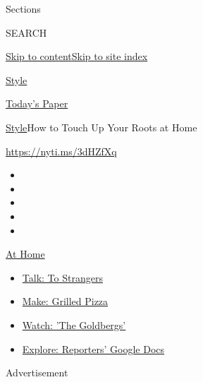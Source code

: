 Sections

SEARCH

\protect\hyperlink{site-content}{Skip to
content}\protect\hyperlink{site-index}{Skip to site index}

\href{https://www.nytimes3xbfgragh.onion/section/style}{Style}

\href{https://myaccount.nytimes3xbfgragh.onion/auth/login?response_type=cookie\&client_id=vi}{}

\href{https://www.nytimes3xbfgragh.onion/section/todayspaper}{Today's
Paper}

\href{/section/style}{Style}\textbar{}How to Touch Up Your Roots at Home

\url{https://nyti.ms/3dHZfXq}

\begin{itemize}
\item
\item
\item
\item
\item
\end{itemize}

\href{https://www.nytimes3xbfgragh.onion/spotlight/at-home?action=click\&pgtype=Article\&state=default\&region=TOP_BANNER\&context=at_home_menu}{At
Home}

\begin{itemize}
\tightlist
\item
  \href{https://www.nytimes3xbfgragh.onion/2020/08/03/well/family/the-benefits-of-talking-to-strangers.html?action=click\&pgtype=Article\&state=default\&region=TOP_BANNER\&context=at_home_menu}{Talk:
  To Strangers}
\item
  \href{https://www.nytimes3xbfgragh.onion/2020/08/01/at-home/coronavirus-make-pizza-on-a-grill.html?action=click\&pgtype=Article\&state=default\&region=TOP_BANNER\&context=at_home_menu}{Make:
  Grilled Pizza}
\item
  \href{https://www.nytimes3xbfgragh.onion/2020/07/31/arts/television/goldbergs-abc-stream.html?action=click\&pgtype=Article\&state=default\&region=TOP_BANNER\&context=at_home_menu}{Watch:
  'The Goldbergs'}
\item
  \href{https://www.nytimes3xbfgragh.onion/interactive/2020/at-home/even-more-reporters-editors-diaries-lists-recommendations.html?action=click\&pgtype=Article\&state=default\&region=TOP_BANNER\&context=at_home_menu}{Explore:
  Reporters' Google Docs}
\end{itemize}

Advertisement


